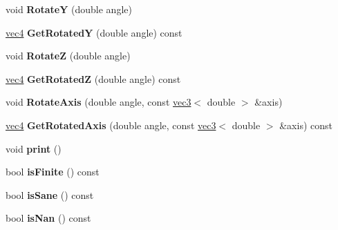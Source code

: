\begin{DoxyCompactItemize}
\item 
\hypertarget{classmath_1_1vec4_a026f4dd69ccbebf731289c8542303295}{
void {\bfseries RotateY} (double angle)}
\label{classmath_1_1vec4_a026f4dd69ccbebf731289c8542303295}

\item 
\hypertarget{classmath_1_1vec4_a29dd7d034b617745f2034c936b2b0cef}{
\hyperlink{classmath_1_1vec4}{vec4} {\bfseries GetRotatedY} (double angle) const }
\label{classmath_1_1vec4_a29dd7d034b617745f2034c936b2b0cef}

\item 
\hypertarget{classmath_1_1vec4_a954df81637322a9e210da712e6e9298b}{
void {\bfseries RotateZ} (double angle)}
\label{classmath_1_1vec4_a954df81637322a9e210da712e6e9298b}

\item 
\hypertarget{classmath_1_1vec4_a5fadcfbdc06d46449a3424021b436fea}{
\hyperlink{classmath_1_1vec4}{vec4} {\bfseries GetRotatedZ} (double angle) const }
\label{classmath_1_1vec4_a5fadcfbdc06d46449a3424021b436fea}

\item 
\hypertarget{classmath_1_1vec4_a9763c5c08728b4f88c8d1909844f24fe}{
void {\bfseries RotateAxis} (double angle, const \hyperlink{classmath_1_1vec3}{vec3}$<$ double $>$ \&axis)}
\label{classmath_1_1vec4_a9763c5c08728b4f88c8d1909844f24fe}

\item 
\hypertarget{classmath_1_1vec4_a604d1048916a4d79f4b796ad92544c11}{
\hyperlink{classmath_1_1vec4}{vec4} {\bfseries GetRotatedAxis} (double angle, const \hyperlink{classmath_1_1vec3}{vec3}$<$ double $>$ \&axis) const }
\label{classmath_1_1vec4_a604d1048916a4d79f4b796ad92544c11}

\item 
\hypertarget{classmath_1_1vec4_a2374cd8fbd0bab19075a8fbd37d19d95}{
void {\bfseries print} ()}
\label{classmath_1_1vec4_a2374cd8fbd0bab19075a8fbd37d19d95}

\item 
\hypertarget{classmath_1_1vec4_ae458887a1a15175784257e89aa293a92}{
bool {\bfseries isFinite} () const }
\label{classmath_1_1vec4_ae458887a1a15175784257e89aa293a92}

\item 
\hypertarget{classmath_1_1vec4_a4434712d244917a44e8e0778444c6846}{
bool {\bfseries isSane} () const }
\label{classmath_1_1vec4_a4434712d244917a44e8e0778444c6846}

\item 
\hypertarget{classmath_1_1vec4_aa6810f8accfcae7c105bcd52efc7a1eb}{
bool {\bfseries isNan} () const }
\label{classmath_1_1vec4_aa6810f8accfcae7c105bcd52efc7a1eb}


\end{DoxyCompactItemize}

